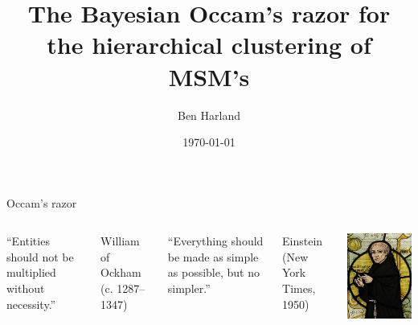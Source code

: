 \documentclass{beamer}
\title{The Bayesian Occam's razor for the hierarchical clustering of MSM's}
\date{\today}
\author{Ben Harland}
\begin{document}
\maketitle

\begin{frame}{Occam's razor}
\begin{columns}[T,onlytextwidth]
\begin{block}{}
``Entities should not be multiplied without necessity.''
\end{block}
\begin{block}
{\small William of Ockham (c. 1287–1347)}
\end{block}
\begin{block}{}
``Everything should be made as simple as possible, but no simpler.''
\end{block}
\begin{block}
{\small Einstein (New York Times, 1950)}
\end{block}
\includegraphics[width=\textwidth]{figures/William_of_Ockham.png}

\end{columns}
\end{frame}
\end{document}
